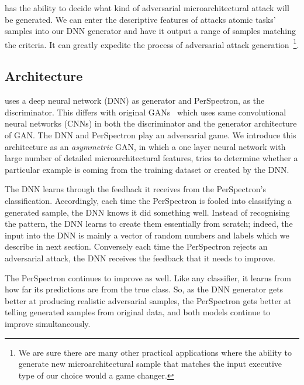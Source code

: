  
 {\scheme} has the ability to decide what kind of adversarial microarchitectural attack will be generated. We can enter the descriptive features of attacks atomic tasks' samples into our DNN generator and have it output a range of samples matching the criteria. It can greatly expedite the process of adversarial attack generation~\footnote{We are sure there are many other practical applications where the ability to generate new microarchitectural sample that matches the input executive type of our choice would a game changer.}.
 
\subsection{{\scheme} Architecture}

{\scheme} uses a deep neural network (DNN) as generator and PerSpectron,  as the discriminator. This differs with original  GANs~\cite{goodfellow2014generative} which uses same convolutional neural
networks (CNNs) in both the discriminator and the generator
architecture of GAN.  The DNN and PerSpectron play an
adversarial game. We introduce this architecture as an {\em asymmetric} GAN, in which a one layer neural network with large number of detailed microarchitectural features, tries to determine whether a particular example is coming from the training dataset or created by the DNN. 

The DNN learns through the feedback it receives from the PerSpectron's classification. 
 Accordingly, each time the PerSpectron is fooled into classifying a generated sample, the DNN knows it did something well. Instead of recognising the pattern, the DNN learns to create them essentially from scratch; indeed, the input into the DNN is mainly a vector of random numbers and labels which we describe in next section.  Conversely each time the PerSpectron  rejects an adversarial attack, the DNN receives the feedback that it needs to improve.

The PerSpectron continues to improve as well. Like any classifier, it learns from how far its predictions are from the true class. 
So, as the DNN generator gets better at producing realistic adversarial samples, the PerSpectron gets better at telling generated samples from original data, and both models continue to improve simultaneously. 






